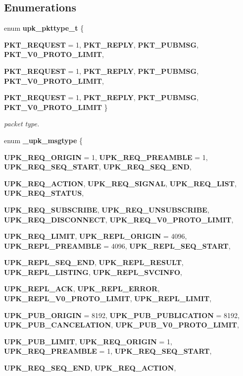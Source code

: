 \subsection*{Enumerations}
\begin{DoxyCompactItemize}
\item 
enum {\bf upk\_\-pkttype\_\-t} \{ \par
{\bf PKT\_\-REQUEST} =  1, 
{\bf PKT\_\-REPLY}, 
{\bf PKT\_\-PUBMSG}, 
{\bf PKT\_\-V0\_\-PROTO\_\-LIMIT}, 
\par
{\bf PKT\_\-REQUEST} =  1, 
{\bf PKT\_\-REPLY}, 
{\bf PKT\_\-PUBMSG}, 
{\bf PKT\_\-V0\_\-PROTO\_\-LIMIT}, 
\par
{\bf PKT\_\-REQUEST} =  1, 
{\bf PKT\_\-REPLY}, 
{\bf PKT\_\-PUBMSG}, 
{\bf PKT\_\-V0\_\-PROTO\_\-LIMIT}
 \}
\begin{DoxyCompactList}\small\item\em packet type. \end{DoxyCompactList}\item 
enum {\bf \_\-upk\_\-msgtype} \{ \par
{\bf UPK\_\-REQ\_\-ORIGIN} =  1, 
{\bf UPK\_\-REQ\_\-PREAMBLE} =  1, 
{\bf UPK\_\-REQ\_\-SEQ\_\-START}, 
{\bf UPK\_\-REQ\_\-SEQ\_\-END}, 
\par
{\bf UPK\_\-REQ\_\-ACTION}, 
{\bf UPK\_\-REQ\_\-SIGNAL}, 
{\bf UPK\_\-REQ\_\-LIST}, 
{\bf UPK\_\-REQ\_\-STATUS}, 
\par
{\bf UPK\_\-REQ\_\-SUBSCRIBE}, 
{\bf UPK\_\-REQ\_\-UNSUBSCRIBE}, 
{\bf UPK\_\-REQ\_\-DISCONNECT}, 
{\bf UPK\_\-REQ\_\-V0\_\-PROTO\_\-LIMIT}, 
\par
{\bf UPK\_\-REQ\_\-LIMIT}, 
{\bf UPK\_\-REPL\_\-ORIGIN} =  4096, 
{\bf UPK\_\-REPL\_\-PREAMBLE} =  4096, 
{\bf UPK\_\-REPL\_\-SEQ\_\-START}, 
\par
{\bf UPK\_\-REPL\_\-SEQ\_\-END}, 
{\bf UPK\_\-REPL\_\-RESULT}, 
{\bf UPK\_\-REPL\_\-LISTING}, 
{\bf UPK\_\-REPL\_\-SVCINFO}, 
\par
{\bf UPK\_\-REPL\_\-ACK}, 
{\bf UPK\_\-REPL\_\-ERROR}, 
{\bf UPK\_\-REPL\_\-V0\_\-PROTO\_\-LIMIT}, 
{\bf UPK\_\-REPL\_\-LIMIT}, 
\par
{\bf UPK\_\-PUB\_\-ORIGIN} =  8192, 
{\bf UPK\_\-PUB\_\-PUBLICATION} =  8192, 
{\bf UPK\_\-PUB\_\-CANCELATION}, 
{\bf UPK\_\-PUB\_\-V0\_\-PROTO\_\-LIMIT}, 
\par
{\bf UPK\_\-PUB\_\-LIMIT}, 
{\bf UPK\_\-REQ\_\-ORIGIN} =  1, 
{\bf UPK\_\-REQ\_\-PREAMBLE} =  1, 
{\bf UPK\_\-REQ\_\-SEQ\_\-START}, 
\par
{\bf UPK\_\-REQ\_\-SEQ\_\-END}, 
{\bf UPK\_\-REQ\_\-ACTION}, 

\end{DoxyCompactItemize}
